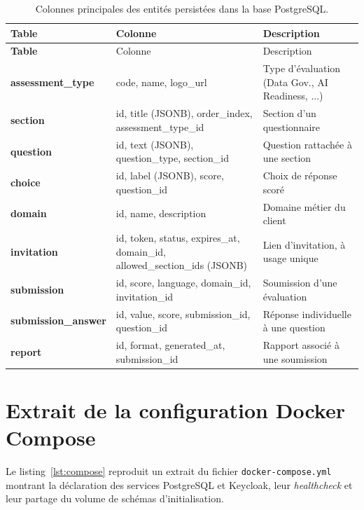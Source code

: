 \documentclass[12pt,a4paper]{report}
\begin{document}
\begin{longtable}{>{\bfseries}L{3.0cm} L{4.0cm} L{6.0cm}}
\caption{Colonnes principales des entités persistées dans la base PostgreSQL.}
\label{tab:schema}\\
\toprule
Table & Colonne & Description \\
\midrule
\endfirsthead
\toprule
Table & Colonne & Description \\
\midrule
\endhead
assessment\_type & code, name, logo\_url & Type d'évaluation (Data Gov., AI Readiness, ...) \\
section & id, title (JSONB), order\_index, assessment\_type\_id & Section d'un questionnaire \\
question & id, text (JSONB), question\_type, section\_id & Question rattachée à une section \\
choice & id, label (JSONB), score, question\_id & Choix de réponse scoré \\
domain & id, name, description & Domaine métier du client \\
invitation & id, token, status, expires\_at, domain\_id, allowed\_section\_ids (JSONB) & Lien d'invitation, à usage unique \\
submission & id, score, language, domain\_id, invitation\_id & Soumission d'une évaluation \\
submission\_answer & id, value, score, submission\_id, question\_id & Réponse individuelle à une question \\
report & id, format, generated\_at, submission\_id & Rapport associé à une soumission \\
\bottomrule
\end{longtable}

\section{Extrait de la configuration Docker Compose}
Le listing~\ref{lst:compose} reproduit un extrait du fichier \texttt{docker-compose.yml} montrant la déclaration des services PostgreSQL et Keycloak, leur \textit{healthcheck} et leur partage du volume de schémas d'initialisation.
\end{document}
